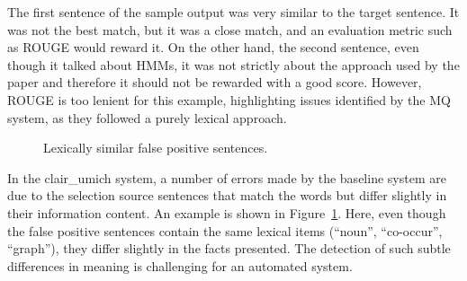 \documentclass[11pt]{article}
\begin{document}
The first sentence of the sample output was very similar to the target
sentence. It was not the best match, but it was a close match, and an
evaluation metric such as ROUGE would reward it. On the other hand,
the second sentence, even though it talked about HMMs, it was not
strictly about the approach used by the paper and therefore it should
not be rewarded with a good score. However, ROUGE is too lenient for
this example, highlighting issues identified by the MQ system, as they
followed a purely lexical approach.

\begin{figure}[h]
\noindent{}
\caption{Lexically similar false positive sentences.}
\vspace{-1cm}
\label{f:2}
\end{figure}

In the clair\_umich system, a number of errors made by the baseline
system are due to the selection source sentences that match the words
but differ slightly in their information content.  An example is shown
in Figure~\ref{f:2}.  Here, even though the false positive sentences
contain the same lexical items (``noun'', ``co-occur'', ``graph''),
they differ slightly in the facts presented. The detection of such subtle
differences in meaning is challenging for an automated system.
\end{document}
